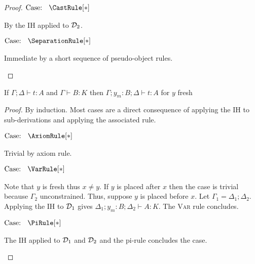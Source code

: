 \begin{proof}
    $\text{Case: }\begin{array}{c} \CastRule[*] \end{array}$
    \begin{proofcase}
        By the IH applied to $\mathcal{D}_{2}$.
    \end{proofcase}

    $\text{Case: }\begin{array}{c} \SeparationRule[*] \end{array}$
    \begin{proofcase}
        Immediate by a short sequence of pseudo-object rules.
    \end{proofcase}
\end{proof}

\begin{lemma}[Weakening]
    \label{lem:2:weakening}
    If $\Gamma; \Delta \vdash t : A$ and $\Gamma \vdash B : K$ then $\Gamma; y_m : B; \Delta \vdash t : A$ for $y$ fresh
\end{lemma}
\begin{proof}
    By induction.
    Most cases are a direct consequence of applying the IH to sub-derivations and applying the associated rule.

    $\text{Case: }\begin{array}{c} \AxiomRule[*] \end{array}$
    \begin{proofcase}
        Trivial by axiom rule.
    \end{proofcase}

    $\text{Case: }\begin{array}{c} \VarRule[*] \end{array}$
    \begin{proofcase}
        Note that $y$ is fresh thus $x \neq y$.
        If $y$ is placed after $x$ then the case is trivial because $\Gamma_2$ unconstrained.
        Thus, suppose $y$ is placed before $x$.
        Let $\Gamma_1 = \Delta_1; \Delta_2$.
        Applying the IH to $\mathcal{D}_{1}$ gives $\Delta_1; y_m : B; \Delta_2 \vdash A : K$.
        The \textsc{Var} rule concludes.
    \end{proofcase}

    $\text{Case: }\begin{array}{c} \PiRule[*] \end{array}$
    \begin{proofcase}
        The IH applied to $\mathcal{D}_{1}$ and $\mathcal{D}_{2}$ and the pi-rule concludes the case.
    \end{proofcase}
\end{proof}

